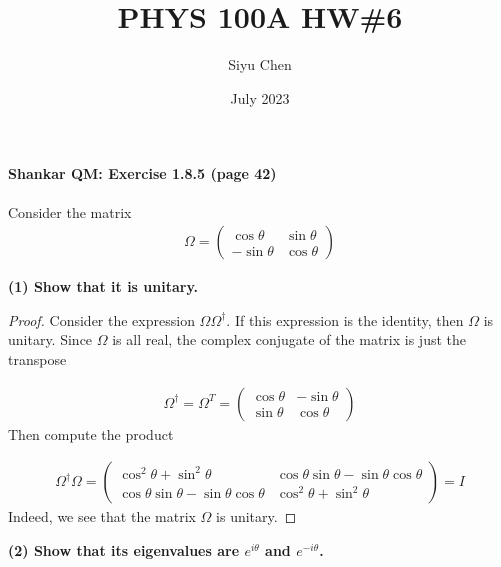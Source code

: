 \documentclass{article}
\title{PHYS 100A HW\#6}
\author{Siyu Chen}
\date{July 2023}
\begin{document}
\maketitle

\paragraph{Shankar QM: Exercise 1.8.5 (page 42)}

Consider the matrix\begin{align*}
\Omega = \begin{pmatrix}
\cos \theta & \sin \theta \\ -\sin \theta & \cos \theta
\end{pmatrix}
\end{align*}

\textbf{(1) Show that it is unitary.}
\begin{proof}
    Consider the expression $\Omega \Omega^\dagger$. If this expression is the identity, then $\Omega$ is unitary. Since $\Omega$ is all real, the complex conjugate of the matrix is just the transpose

    \begin{align}
        \Omega^\dagger = \Omega^T = \begin{pmatrix}
            \cos \theta & -\sin \theta \\ \sin \theta & \cos \theta 
        \end{pmatrix}
    \end{align}
    Then compute the product 

    \begin{align}
        \Omega^\dagger \Omega = \begin{pmatrix}
            \cos^2 \theta + \sin^2 \theta & \cos \theta \sin \theta - \sin\theta \cos\theta \\ \cos \theta \sin \theta - \sin\theta \cos\theta & \cos^2 \theta + \sin^2 \theta
        \end{pmatrix} = I
    \end{align}
    Indeed, we see that the matrix $\Omega$ is unitary.
\end{proof}

\textbf{(2) Show that its eigenvalues are $e^{i\theta}$ and $e^{-i\theta}$.}
\end{document}
